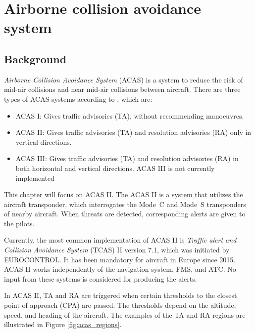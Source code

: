 \chapter{Airborne collision avoidance system}

\section{Background}

\emph{Airborne Collision Avoidance System} (ACAS) is a system to reduce the risk of mid-air collisions and near mid-air collisions between aircraft. There are three types of ACAS systems according to \cite{icaoA10V4}, which are:

\begin{itemize}
  \item ACAS I: Gives traffic advisories (TA), without recommending manoeuvres.
  \item ACAS II: Gives traffic advisories (TA) and resolution advisories (RA) only in vertical directions.
  \item ACAS III: Gives traffic advisories (TA) and resolution advisories (RA) in both horizontal and vertical directions. ACAS III is not currently implemented
\end{itemize}

This chapter will focus on ACAS II. The ACAS II is a system that utilizes the aircraft transponder, which interrogates the Mode~C and Mode~S transponders of nearby aircraft. When threats are detected, corresponding alerts are given to the pilots.

Currently, the most common implementation of ACAS II is \emph{Traffic alert and Collision Avoidance System} (TCAS) II version 7.1, which was initiated by EUROCONTROL. It has been mandatory for aircraft in Europe since 2015. ACAS II works independently of the navigation system, FMS, and ATC. No input from these systems is considered for producing the alerts.

In ACAS II, TA and RA are triggered when certain thresholds to the closest point of approach (CPA) are passed. The thresholds depend on the altitude, speed, and heading of the aircraft. The examples of the TA and RA regions are illustrated in Figure \ref{fig:acas_regions}.

